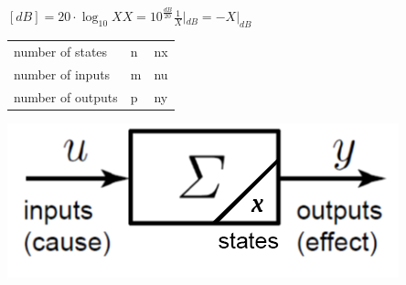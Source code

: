 \documentclass[10pt,a4paper]{scrartcl}
\begin{document}
\begin{multicols*}{3}
\begin{center}
	\finn
	
	$[dB]=20\cdot\log_{10}{X}$\hfill$X=10^{\frac{dB}{20}}$\hfill$\frac{1}{X}|_{dB}=-X|_{dB}$
	
	\end{center}
	
	\vspace{3ex}
	
	\setlength{\columnseprule}{0pt}
	\small
	\begin{multicols*}{2}
	\begin{tabular}{ll@{=}l}
	number of states&n&nx\\
	number of inputs&m&nu\\
	number of outputs&p&ny\\
	\end{tabular}
	\normalsize
	\includegraphics[width=\linewidth]{Signal1}
	\end{multicols*}
	\setlength{\columnseprule}{0.5pt}
	
\end{multicols*}






\end{document}
